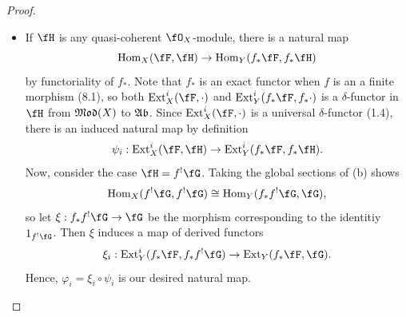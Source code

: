 \documentclass[a4paper]{article}
\begin{document}
\begin{enumerate} [label=\textbf{\arabic*.}, leftmargin=0em]
\begin{proof}
\begin{itemize} [leftmargin=0cm]
            \item[(c)] If $\fH$ is any quasi-coherent $\fO_X$-module, there is a natural map
                  \begin{equation*}
                    \Hom_X(\fF, \fH) \to \Hom_Y(f_*\fF, f_*\fH)
                  \end{equation*}
                  by functoriality of $f_*$.
                  Note that $f_*$ is an exact functor when $f$ is an a finite morphism (8.1), so both $\Ext_X^i(\fF, \cdot)$ and $\Ext_Y^i(f_*\fF, f_* \cdot)$ is a $\delta$-functor in $\fH$ from $\mathfrak{Mod}(X)$ to $\mathfrak{Ab}$.
                  Since $\Ext_X^i(\fF, \cdot)$ is a universal $\delta$-functor (1.4), there is an induced natural map by definition
                  \begin{equation*}
                    \psi_i : \Ext_X^i(\fF, \fH) \to \Ext_Y^i(f_*\fF, f_*\fH).
                  \end{equation*}
                  Now, consider the case $\fH = f^!\fG$.
                  Taking the global sections of (b) shows
                  \begin{equation*}
                    \Hom_X(f^!\fG, f^!\fG) \cong \Hom_Y(f_*f^!\fG, \fG),
                  \end{equation*}
                  so let $\xi : f_*f^!\fG \to \fG$ be the morphism corresponding to the identitiy $1_{f^!\fG}$.
                  Then $\xi$ induces a map of derived functors
                  \begin{equation*}
                    \xi_i : \Ext_Y^i(f_*\fF, f_*f^!\fG) \to \Ext_Y(f_*\fF, \fG).
                  \end{equation*}
                  Hence, $\varphi_i = \xi_i \circ \psi_i$ is our desired natural map.
          \end{itemize}
        \end{proof}

\end{enumerate}
\end{document}
